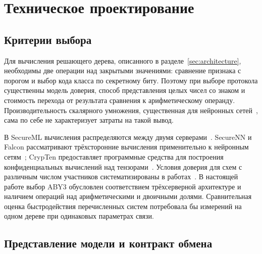 \section{Техническое проектирование}
\label{sec:protocol}

\subsection{Критерии выбора}

Для вычисления решающего дерева, описанного в разделе~\ref{sec:architecture},
необходимы две операции над закрытыми значениями: сравнение признака с порогом
и выбор кода класса по секретному биту. Поэтому при выборе протокола
существенны модель доверия, способ представления целых чисел со знаком
и стоимость перехода от результата сравнения к арифметическому операнду.
Производительность скалярного умножения, существенная для нейронных
сетей~\cite{lapina2024}, сама по себе не характеризует затраты на такой вывод.

В SecureML вычисления распределяются между двумя серверами~\cite{mohassel2017secureml}.
SecureNN и Falcon рассматривают трёхсторонние вычисления применительно к
нейронным сетям~\cite{wagh2019securenn,wagh2021falcon}; CrypTen предоставляет
программные средства для построения конфиденциальных вычислений над
тензорами~\cite{knott2021crypten}. Условия доверия для схем с различным
числом участников систематизированы в
работах~\cite{zapechnikov2022three,zapechnikov2022four}. В настоящей работе
выбор ABY3 обусловлен соответствием трёхсерверной архитектуре и наличием
операций над арифметическими и двоичными долями. Сравнительная оценка
быстродействия перечисленных систем потребовала бы измерений на одном дереве
при одинаковых параметрах связи.

\subsection{Представление модели и контракт обмена}

